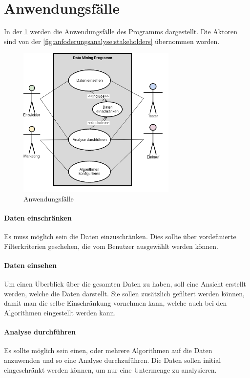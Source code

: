 \section{Anwendungsfälle}
\label{sec:anforderungsanalyse:anwendungsfaelle}
In der \cref{fig:anfoderungsanalyse:anwendungsfaelle:1} werden die Anwendungsfälle des Programms dargestellt. Die Aktoren sind von der \cref{fig:anfoderungsanalyse:stakeholders} übernommen worden. 
\begin{figure}[H]
	\RawFloats
	\centering
	\includegraphics[width=0.7\textwidth]{images/usecase}
	\caption{Anwendungsfälle}
	\label{fig:anfoderungsanalyse:anwendungsfaelle:1}
\end{figure}

\paragraph{Daten einschränken} Es muss möglich sein die Daten einzuschränken. Dies sollte über vordefinierte Filterkriterien geschehen, die vom Benutzer ausgewählt werden können.

\paragraph{Daten einsehen} Um einen Überblick über die gesamten Daten zu haben, soll eine Ansicht erstellt werden, welche die Daten darstellt. Sie sollen zusätzlich gefiltert werden können, damit man die selbe Einschränkung vornehmen kann, welche auch bei den Algorithmen eingestellt werden kann.

\paragraph{Analyse durchführen} Es sollte möglich sein einen, oder mehrere Algorithmen auf die Daten anzuwenden und so eine Analyse durchzuführen. Die Daten sollen initial eingeschränkt werden können, um nur eine Untermenge zu analysieren.

